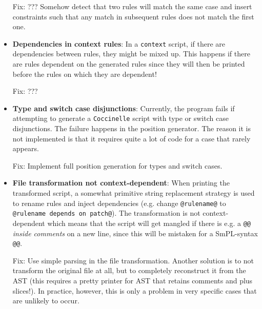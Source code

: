 \begin{itemize}
Fix: ??? Somehow detect that two rules will match the same case and insert constraints such that any match in subsequent rules does not match the first one.
\item \textbf{Dependencies in context rules}: In a \texttt{context} script, if there are dependencies between rules, they might be mixed up. This happens if there are rules dependent on the generated rules since they will then be printed before the rules on which they are dependent!

Fix: ???
\item \textbf{Type and switch case disjunctions}: Currently, the program fails if attempting to generate a \texttt{Coccinelle} script with type or switch case disjunctions. The failure happens in the position generator. The reason it is not implemented is that it requires quite a lot of code for a case that rarely appears.

Fix: Implement full position generation for types and switch cases.
\item \textbf{File transformation not context-dependent}: When printing the transformed script, a somewhat primitive string replacement strategy is used to rename rules and inject dependencies (e.g. change \texttt{@rulename@} to \texttt{@rulename depends on patch@}). The transformation is not context-dependent which means that the script will get mangled if there is e.g. a \texttt{@@} \textit{inside comments} on a new line, since this will be mistaken for a SmPL-syntax \texttt{@@}.

Fix: Use simple parsing in the file transformation. Another solution is to not transform the original file at all, but to completely reconstruct it from the AST (this requires a pretty printer for AST that retains comments and plus slices!). In practice, however, this is only a problem in very specific cases that are unlikely to occur.
\end{itemize}
